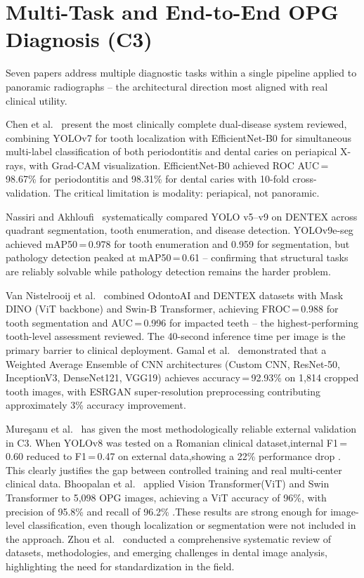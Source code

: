 \documentclass[conference]{IEEEtran}
\begin{document}
\section{Multi-Task and End-to-End OPG Diagnosis (C3)}
\label{sec:multitask}

Seven papers address multiple diagnostic tasks within a single pipeline
applied to panoramic radiographs -- the architectural direction most
aligned with real clinical utility.

Chen et al.~\cite{chen2023deep} present the most clinically complete
dual-disease system reviewed, combining YOLOv7 for tooth localization
with EfficientNet-B0 for simultaneous multi-label classification of both
periodontitis and dental caries on periapical X-rays, with Grad-CAM
visualization. EfficientNet-B0 achieved ROC AUC\,=\,98.67\% for
periodontitis and 98.31\% for dental caries with 10-fold
cross-validation. The critical limitation is modality: periapical, not
panoramic.

Nassiri and Akhloufi~\cite{nassiri2025yolo} systematically compared YOLO
v5--v9 on DENTEX across quadrant segmentation, tooth enumeration, and
disease detection. YOLOv9e-seg achieved mAP50\,=\,0.978 for tooth
enumeration and 0.959 for segmentation, but pathology detection peaked
at mAP50\,=\,0.61 -- confirming that structural tasks are reliably
solvable while pathology detection remains the harder problem.

Van Nistelrooij et al.~\cite{vannistelrooij2024combining} combined
OdontoAI and DENTEX datasets with Mask DINO (ViT backbone) and Swin-B
Transformer, achieving FROC\,=\,0.988 for tooth segmentation and
AUC\,=\,0.996 for impacted teeth -- the highest-performing tooth-level
assessment reviewed. The 40-second inference time per image is the
primary barrier to clinical deployment. Gamal et
al.~\cite{gamal2025automated} demonstrated that a Weighted Average
Ensemble of CNN architectures (Custom CNN, ResNet-50, InceptionV3,
DenseNet121, VGG19) achieves accuracy\,=\,92.93\% on 1,814 cropped
tooth images, with ESRGAN super-resolution preprocessing contributing
approximately 3\% accuracy improvement.

Mure\c{s}anu et al.~\cite{muresanu2024automating} has given the most
methodologically reliable external validation in C3. When YOLOv8 was tested on a
Romanian clinical dataset,internal F1\,=\,0.60 reduced to
 F1\,=\,0.47 on external data,showing a 22\% performance drop . This clearly justifies
the gap between controlled training and real multi-center
clinical data. Bhoopalan et al.~\cite{bhoopalan2026self} applied Vision Transformer(ViT) and
Swin Transformer to 5,098 OPG images, achieving a ViT accuracy of 96\%, with
precision of 95.8\% and recall of 96.2\% .These results are strong enough for
image-level classification, even though localization or segmentation were not included in the approach.
Zhou et al.~\cite{zhou2025deep} conducted a comprehensive systematic
review of datasets, methodologies, and emerging challenges in dental
image analysis, highlighting the need for standardization in the field.
\end{document}
